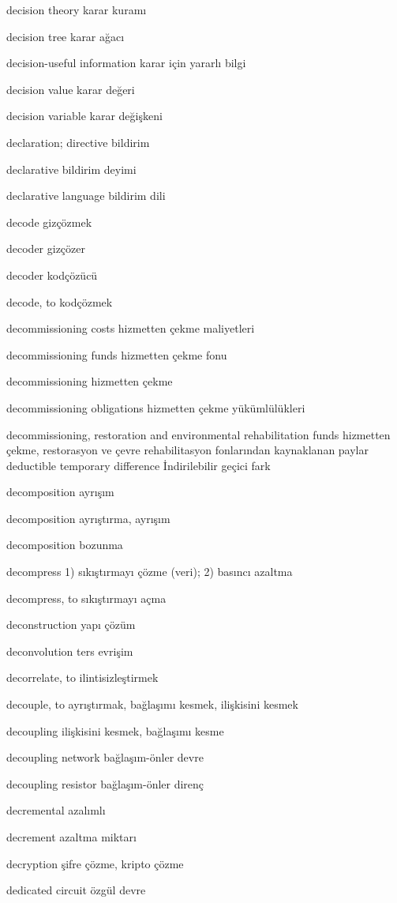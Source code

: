 \documentclass[12pt,fleqn]{article}\usepackage{../../common}
\begin{document}
decision theory karar kuramı

decision tree karar ağacı

decision-useful information karar için yararlı bilgi

decision value karar değeri

decision variable karar değişkeni

declaration; directive bildirim

declarative bildirim deyimi

declarative language bildirim dili

decode gizçözmek

decoder gizçözer

decoder kodçözücü

decode, to kodçözmek

decommissioning costs hizmetten çekme maliyetleri

decommissioning funds hizmetten çekme fonu

decommissioning hizmetten çekme

decommissioning obligations hizmetten çekme yükümlülükleri

decommissioning, restoration and environmental rehabilitation funds hizmetten çekme, restorasyon ve çevre rehabilitasyon fonlarından kaynaklanan paylar deductible temporary difference İndirilebilir geçici fark

decomposition ayrışım

decomposition ayrıştırma, ayrışım

decomposition bozunma

decompress 1) sıkıştırmayı çözme (veri); 2) basıncı azaltma

decompress, to sıkıştırmayı açma

deconstruction yapı çözüm

deconvolution ters evrişim

decorrelate, to ilintisizleştirmek

decouple, to ayrıştırmak, bağlaşımı kesmek, ilişkisini kesmek

decoupling ilişkisini kesmek, bağlaşımı kesme

decoupling network bağlaşım-önler devre

decoupling resistor bağlaşım-önler direnç

decremental azalımlı

decrement azaltma miktarı

decryption şifre çözme, kripto çözme

dedicated circuit özgül devre
\end{document}

